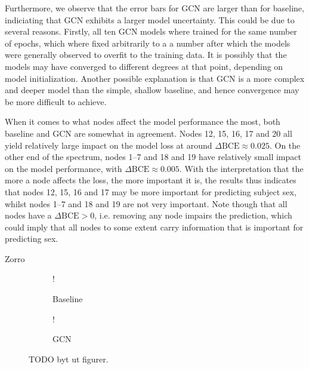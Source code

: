 Furthermore, we observe that the error bars for GCN are larger than for baseline, indiciating that GCN exhibits a larger model uncertainty. This could be due to several reasons. Firstly, all ten GCN models where trained for the same number of epochs, which where fixed arbitrarily to a a number after which the models were generally observed to overfit to the training data. It is possibly that the models may have converged to different degrees at that point, depending on model initialization. Another possible explanation is that GCN is a more complex and deeper model than the simple, shallow baseline, and hence convergence may be more difficult to achieve. 

When it comes to what nodes affect the model performance the most, both baseline and GCN are somewhat in agreement. Nodes 12, 15, 16, 17 and 20 all yield relatively large impact on the model loss at around $\Delta \text{BCE} \approx 0.025$. On the other end of the spectrum, nodes 1--7 and 18 and 19 have relatively small impact on the model performance, with $\Delta \text{BCE} \approx 0.005$. With the interpretation that the more a node affects the loss, the more important it is, the results thus indicates that nodes 12, 15, 16 and 17 may be more important for predicting subject sex, whilst nodes 1--7 and 18 and 19 are not very important. Note though that all nodes have a $\Delta\text{BCE}>0$, i.e. removing any node impairs the prediction, which could imply that all nodes to some extent carry information that is important for predicting sex. 


Zorro

\begin{figure}[H]
    \centering
        \begin{subfigure}{.5\textwidth}
            \centering
            \begin{center}
                 {!} {
                    
                }
            \end{center}
            \caption{Baseline}
            \label{fig:zorro_sex_baseline}
        \end{subfigure}%
        \begin{subfigure}{.5\textwidth}
            \centering
            \begin{center}
                 {!} {
                    
                }
            \end{center}
            \caption{GCN}
            \label{fig:zorro_sex_gcn}
        \end{subfigure}
    \caption{TODO byt ut figurer.}
    \label{fig:zorro_sex}
\end{figure}

